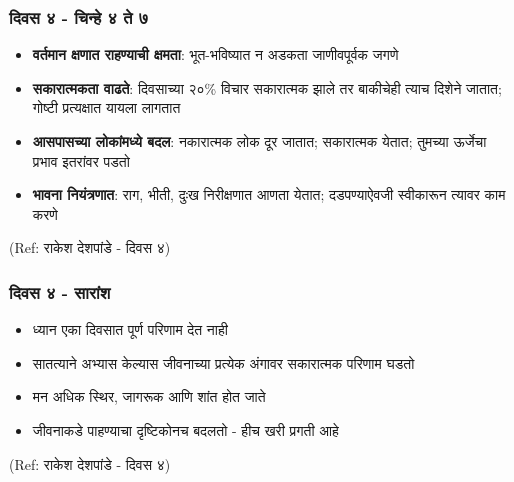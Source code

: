 \begin{frame}[fragile]\frametitle{दिवस ४ - चिन्हे ४ ते ७}

	\begin{itemize}
	\item \textbf{वर्तमान क्षणात राहण्याची क्षमता}: भूत-भविष्यात न अडकता जाणीवपूर्वक जगणे
	\item \textbf{सकारात्मकता वाढते}: दिवसाच्या २०\% विचार सकारात्मक झाले तर बाकीचेही त्याच दिशेने जातात; गोष्टी प्रत्यक्षात यायला लागतात
	\item \textbf{आसपासच्या लोकांमध्ये बदल}: नकारात्मक लोक दूर जातात; सकारात्मक येतात; तुमच्या ऊर्जेचा प्रभाव इतरांवर पडतो
	\item \textbf{भावना नियंत्रणात}: राग, भीती, दुःख निरीक्षणात आणता येतात; दडपण्याऐवजी स्वीकारून त्यावर काम करणे
	\end{itemize}

{\tiny (Ref: राकेश देशपांडे - दिवस ४)}

\end{frame}

\begin{frame}[fragile]\frametitle{दिवस ४ - सारांश}

	\begin{itemize}
	\item ध्यान एका दिवसात पूर्ण परिणाम देत नाही
	\item सातत्याने अभ्यास केल्यास जीवनाच्या प्रत्येक अंगावर सकारात्मक परिणाम घडतो
	\item मन अधिक स्थिर, जागरूक आणि शांत होत जाते
	\item जीवनाकडे पाहण्याचा दृष्टिकोनच बदलतो - हीच खरी प्रगती आहे
	\end{itemize}

{\tiny (Ref: राकेश देशपांडे - दिवस ४)}

\end{frame}


